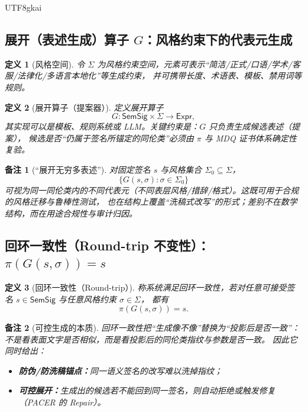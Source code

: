 \documentclass[12pt]{article}
\newtheorem{definition}{定义}[section]
\newtheorem{remark}{备注}[section]
\begin{document}
\begin{CJK*}{UTF8}{gkai}
\subsection{展开（表述生成）算子 \texorpdfstring{$G$}{G}：风格约束下的代表元生成}
\label{subsec:expansion-generator}

\begin{definition}[风格空间]
令 $\Sigma$ 为风格约束空间，元素可表示“简洁/正式/口语/学术/客服/法律化/多语言本地化”等生成约束，
并可携带长度、术语表、模板、禁用词等规则。
\end{definition}

\begin{definition}[展开算子（提案器）]
定义展开算子
\[
G:\mathsf{SemSig}\times \Sigma\to \mathsf{Expr},
\]
其实现可以是模板、规则系统或 LLM。关键约束是：$G$ 只负责生成候选表述（提案），
候选是否“仍属于签名所锚定的同伦类”必须由 $\pi$ 与 MDQ 证书体系确定性复验。
\end{definition}

\begin{remark}[“展开无穷多表述”]
对固定签名 $s$ 与风格集合 $\Sigma_0\subseteq \Sigma$，
\[
\{G(s,\sigma):\sigma\in \Sigma_0\}
\]
可视为同一同伦类内的不同代表元（不同表层风格/措辞/格式）。这既可用于合规的风格迁移与鲁棒性测试，
也在结构上覆盖“洗稿式改写”的形式；差别不在数学结构，而在用途合规性与审计归因。
\end{remark}

\subsection{回环一致性（Round-trip 不变性）：\texorpdfstring{$\pi(G(s,\sigma))=s$}{pi(G)=s}}
\label{subsec:roundtrip-invariance}

\begin{definition}[回环一致性（Round-trip）]
称系统满足回环一致性，若对任意可接受签名 $s\in\mathsf{SemSig}$ 与任意风格约束 $\sigma\in\Sigma$，
都有
\[
\pi(G(s,\sigma))=s.
\]
\end{definition}

\begin{remark}[可控生成的本质]
回环一致性把“生成像不像”替换为“投影后是否一致”：不是看表面文字是否相似，而是看投影后的同伦类指纹与参数是否一致。
因此它同时给出：
\begin{itemize}
  \item \textbf{防伪/防洗稿锚点：}同一语义签名的改写难以洗掉指纹；
  \item \textbf{可控展开：}生成出的候选若不能回到同一签名，则自动拒绝或触发修复（PACER 的 Repair）。
\end{itemize}
\end{remark}


\end{CJK*}
\end{document}
